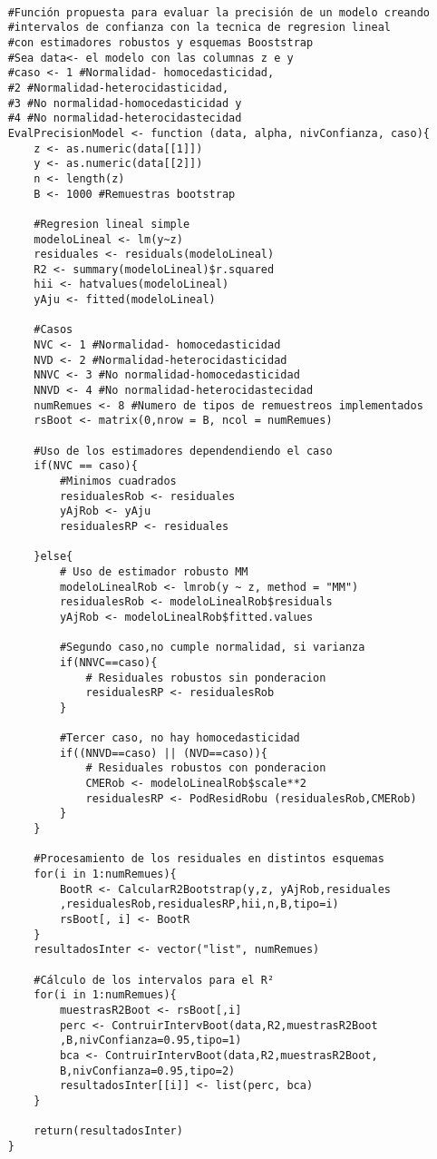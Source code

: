 \begin{verbatim}
	
	#Función propuesta para evaluar la precisión de un modelo creando
	#intervalos de confianza con la tecnica de regresion lineal
	#con estimadores robustos y esquemas Booststrap
	#Sea data<- el modelo con las columnas z e y
	#caso <- 1 #Normalidad- homocedasticidad,
	#2 #Normalidad-heterocidasticidad,
	#3 #No normalidad-homocedasticidad y 
	#4 #No normalidad-heterocidastecidad 
	EvalPrecisionModel <- function (data, alpha, nivConfianza, caso){
		z <- as.numeric(data[[1]])
		y <- as.numeric(data[[2]])
		n <- length(z)
		B <- 1000 #Remuestras bootstrap
		
		#Regresion lineal simple
		modeloLineal <- lm(y~z)
		residuales <- residuals(modeloLineal)
		R2 <- summary(modeloLineal)$r.squared
		hii <- hatvalues(modeloLineal)
		yAju <- fitted(modeloLineal)
		
		#Casos
		NVC <- 1 #Normalidad- homocedasticidad
		NVD <- 2 #Normalidad-heterocidasticidad
		NNVC <- 3 #No normalidad-homocedasticidad
		NNVD <- 4 #No normalidad-heterocidastecidad 
		numRemues <- 8 #Numero de tipos de remuestreos implementados
		rsBoot <- matrix(0,nrow = B, ncol = numRemues)
		
		#Uso de los estimadores dependendiendo el caso
		if(NVC == caso){
			#Minimos cuadrados
			residualesRob <- residuales
			yAjRob <- yAju
			residualesRP <- residuales
			
		}else{
			# Uso de estimador robusto MM  
			modeloLinealRob <- lmrob(y ~ z, method = "MM")
			residualesRob <- modeloLinealRob$residuals
			yAjRob <- modeloLinealRob$fitted.values
			
			#Segundo caso,no cumple normalidad, si varianza
			if(NNVC==caso){
				# Residuales robustos sin ponderacion
				residualesRP <- residualesRob
			}
			
			#Tercer caso, no hay homocedasticidad
			if((NNVD==caso) || (NVD==caso)){
				# Residuales robustos con ponderacion
				CMERob <- modeloLinealRob$scale**2
				residualesRP <- PodResidRobu (residualesRob,CMERob)
			}
		}
		
		#Procesamiento de los residuales en distintos esquemas
		for(i in 1:numRemues){
			BootR <- CalcularR2Bootstrap(y,z, yAjRob,residuales
			,residualesRob,residualesRP,hii,n,B,tipo=i)
			rsBoot[, i] <- BootR
		}
		resultadosInter <- vector("list", numRemues)
		
		#Cálculo de los intervalos para el R²
		for(i in 1:numRemues){
			muestrasR2Boot <- rsBoot[,i]
			perc <- ContruirIntervBoot(data,R2,muestrasR2Boot
			,B,nivConfianza=0.95,tipo=1)
			bca <- ContruirIntervBoot(data,R2,muestrasR2Boot,
			B,nivConfianza=0.95,tipo=2)
			resultadosInter[[i]] <- list(perc, bca)
		}
		
		return(resultadosInter)
	}
\end{verbatim}



